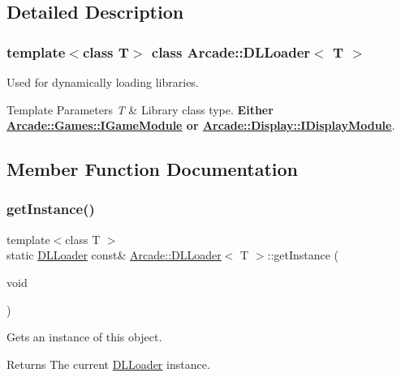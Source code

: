 \subsection{Detailed Description}
\subsubsection*{template$<$class T$>$\newline
class Arcade\+::\+D\+L\+Loader$<$ T $>$}

Used for dynamically loading libraries. 


\begin{DoxyTemplParams}{Template Parameters}
{\em T} & Library class type. {\bfseries{Either \mbox{\hyperlink{classArcade_1_1Games_1_1IGameModule}{Arcade\+::\+Games\+::\+I\+Game\+Module}} or \mbox{\hyperlink{classArcade_1_1Display_1_1IDisplayModule}{Arcade\+::\+Display\+::\+I\+Display\+Module}}}}. \\
\hline
\end{DoxyTemplParams}


\subsection{Member Function Documentation}
\mbox{\label{classArcade_1_1DLLoader_a7a75048aa067e9e75aaf5faae6cfa4c1}} 
\subsubsection{\texorpdfstring{getInstance()}{getInstance()}}
{\footnotesize\ttfamily template$<$class T $>$ \\
static \mbox{\hyperlink{classArcade_1_1DLLoader}{D\+L\+Loader}} const\& \mbox{\hyperlink{classArcade_1_1DLLoader}{Arcade\+::\+D\+L\+Loader}}$<$ T $>$\+::get\+Instance (\begin{DoxyParamCaption}\item[{void}]{ }\end{DoxyParamCaption})\hspace{0.3cm}{\ttfamily [static]}}



Gets an instance of this object. 

\begin{DoxyReturn}{Returns}
The current \mbox{\hyperlink{classArcade_1_1DLLoader}{D\+L\+Loader}} instance. 
\end{DoxyReturn}
\mbox{\label{classArcade_1_1DLLoader_a3c3fa714d6fbaf4481a1fe015a3e18ab}} 

